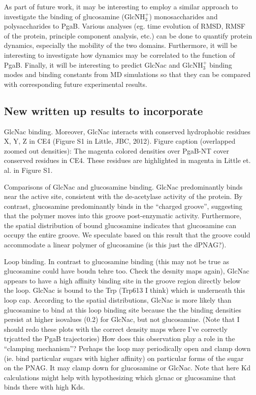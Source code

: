 

As part of future work, it may be interesting to employ a similar approach to investigate the binding of glucosamine (GlcNH$_3^+$) monosaccharides and polysaccharides to PgaB.  Various analyses (eg. time evolution of RMSD, RMSF of the protein, principle component analysis, etc.) can be done to quantify protein dynamics, especially the mobility of the two domains. Furthermore, it will be interesting to investigate how dynamics may be correlated to the function of PgaB.  Finally, it will be interesting to predict GlcNac and GlcNH$_3^+$ binding modes and binding constants from MD simulations so that they can be compared with corresponding future experimental results.


\subsection{New written up results to incorporate}

GlcNac binding. Moreover, GlcNac interacts with conserved hydrophobic residues X, Y, Z in CE4 (Figure S1 in Little, JBC, 2012). Figure caption (overlapped zoomed out densities): The magenta colored densities over PgaB-NT cover conserved residues in CE4.  These residues are highlighted in magenta in Little et. al. in Figure S1. 

Comparisons of GlcNac and glucosamine binding. GlcNac predominantly binds near the active site, consistent with the de-acetylase activity of the protein. By contrast, glucosamine predominantly binds in the “charged groove”, suggesting that the polymer moves into this groove post-enzymatic activity.  Furthermore, the spatial distribution of bound glucosamine indicates that glucosamine can occupy the entire groove.  We speculate based on this result that the groove could accommodate a linear polymer of glucosamine (is this just the dPNAG?).

Loop binding. In contrast to glucosamine binding (this may not be true as glucosamine could have boudn tehre too. Check the desnity maps again), GlcNac appears to have a high affinity binding site in the groove region directly below the loop.  GlcNac is bound to the Trp (Trp613 I think) which is underneath this loop cap. According to the spatial distributions, GlcNac is more likely than glucosamine to bind at this loop binding site because the the binding densities persist at higher isovalues (0.2) for GlcNac, but not glucosamine. (Note that I should redo these plots with the correct density maps where I’ve correctly trjcatted the PgaB trajectories) How does this observation play a role in the “clamping mechanism”?  Perhaps the loop may periodically open and clamp down (ie. bind particular sugars with higher affinity) on particular forms of the sugar on the PNAG.  It may clamp down for glucosamine or GlcNac.  Note that here Kd calculations might help with hypothesizing which glcnac or glucosamine that binds there with high Kds.

